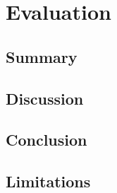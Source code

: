 \chapter{Evaluation}\label{cha:conclusion}
\section{Summary}

\section{Discussion}
\section{Conclusion}
\section{Limitations}
